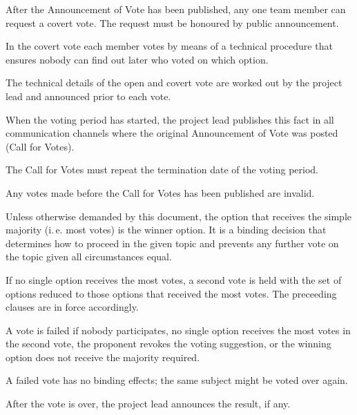 \documentclass[10pt,a4paper,DIV=calc,headings=medium,twocolumn,final]{scrartcl}
\newcommand\ie{i.\,e.\xspace}
\begin{document}
\begin{contract}

  After the Announcement of Vote has been published, any one team
  member can request a covert vote. The request must be honoured by
  public announcement.

  In the covert vote each member votes by means of a technical
  procedure that ensures nobody can find out later who voted on which
  option.


  The technical details of the open and covert vote are worked out by
  the project lead and announced prior to each vote.


  When the voting period has started, the project lead publishes this
  fact in all communication channels where the original Announcement
  of Vote was posted (Call for Votes).

  The Call for Votes must repeat the termination date of the voting
  period.

  Any votes made before the Call for Votes has been published are
  invalid.


  Unless otherwise demanded by this document, the option that receives
  the simple majority (\ie most votes) is the winner option. It is a
  binding decision that determines how to proceed in the given topic
  and prevents any further vote on the topic given all circumstances
  equal.


  If no single option receives the most votes, a second vote is held
  with the set of options reduced to those options that received the
  most votes. The preceeding clauses are in force accordingly.

  \label{failedvote}

  A vote is failed if nobody participates, no single option receives
  the most votes in the second vote, the proponent revokes the
  voting suggestion, or the winning option does not receive the
  majority required.

  A failed vote has no binding effects; the same subject might be
  voted over again.


  After the vote is over, the project lead announces the result, if
  any.
\end{contract}
\end{document}
